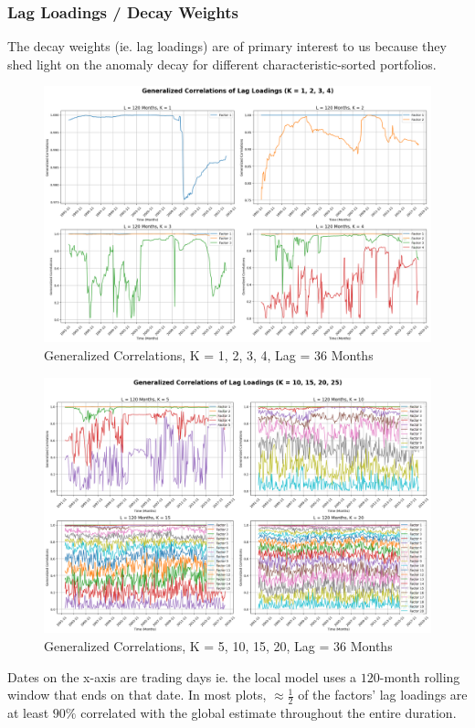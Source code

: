 \documentclass{article}
\begin{document}
\subsubsection{Lag Loadings / Decay Weights}

The decay weights (ie. lag loadings) are of primary interest to us because they shed light on the anomaly decay 
for different characteristic-sorted portfolios.

\begin{figure}[H]
    \centering
    \includegraphics[width=0.85\linewidth]{W_gc_1.png}
    \caption{Generalized Correlations, K = 1, 2, 3, 4, Lag = 36 Months}
    \label{fig:W_gc_1}
\end{figure}
\begin{figure}[H]
    \centering
    \includegraphics[width=0.85\linewidth]{W_gc_2.png}
    \caption{Generalized Correlations, K = 5, 10, 15, 20, Lag = 36 Months}
    \label{fig:W_gc_2}
\end{figure}

Dates on the x-axis are trading days ie. the local model uses a $120$-month rolling window that 
ends on that date. In most plots, $\approx \frac{1}{2}$ of the factors' lag loadings are at least 
$90\%$ correlated with the global estimate throughout the entire duration. 
\end{document}
